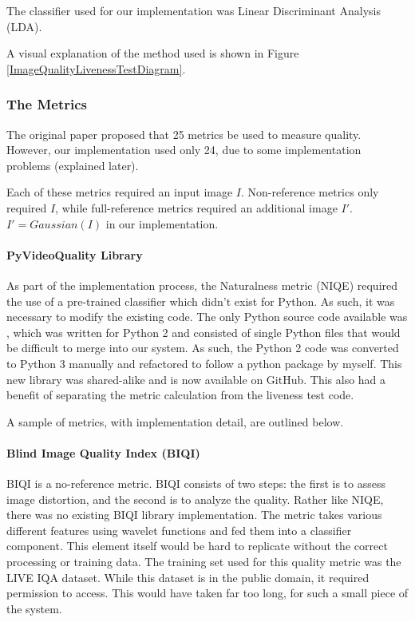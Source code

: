 \documentclass[12pt,a4paper]{article}
\begin{document}
            The classifier used for our implementation was Linear Discriminant Analysis (LDA).

            A visual explanation of the method used is shown in Figure \ref{ImageQualityLivenessTestDiagram}.
    
            \subsubsection{The Metrics}
            The original paper proposed that 25 metrics be used to measure quality. However, our implementation used only 24, due to some implementation problems (explained later).

            Each of these metrics required an input image $I$. Non-reference metrics only required $I$, while full-reference metrics required an additional image $I'$. $I' = Gaussian(I)$ in our implementation.
            
            \paragraph{PyVideoQuality Library}
            As part of the implementation process, the Naturalness metric (NIQE) required the use of a pre-trained classifier which didn't exist for Python. As such, it was necessary to modify the existing code.
            The only Python source code available was \cite{VideoQualityOriginal}, which was written for Python 2 and consisted of single Python files that would be difficult to merge into our system.
            As such, the Python 2 code was converted to Python 3 manually and refactored to follow a python package by myself. This new library was shared-alike and is now available on GitHub. \cite{VideoQualityUpdated} This also had a benefit of separating the metric calculation from the liveness test code.
            
            A sample of metrics, with implementation detail, are outlined below.
           
            \paragraph{Blind Image Quality Index (BIQI)}
                BIQI is a no-reference metric. BIQI consists of two steps: the first is to assess image distortion, and the second is to analyze the quality.  Rather like NIQE, there was no existing BIQI library implementation. The metric takes various different features using wavelet functions and fed them into a classifier component. This element itself would be hard to replicate without the correct processing or training data. The training set used for this quality metric was the LIVE IQA dataset. While this dataset is in the public domain, it required permission to access. This would have taken far too long, for such a small piece of the system.
\end{document}
